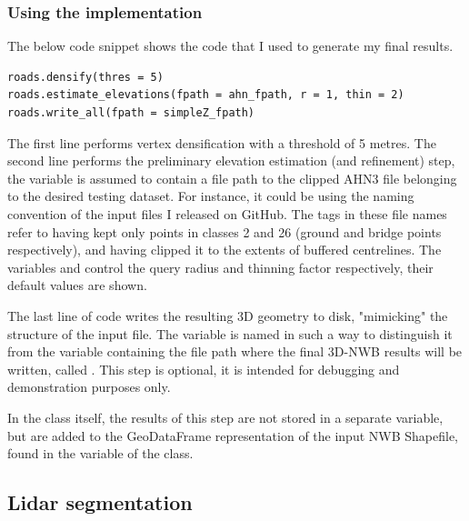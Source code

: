 \subsubsection{Using the implementation}

The below code snippet shows the code that I used to generate my final results.

\begin{lstlisting}
roads.densify(thres = 5)
roads.estimate_elevations(fpath = ahn_fpath, r = 1, thin = 2)
roads.write_all(fpath = simpleZ_fpath)
\end{lstlisting}

The first line performs vertex densification with a threshold of 5 metres. The second line performs the preliminary elevation estimation (and refinement) step, the variable  is assumed to contain a file path to the clipped AHN3 file belonging to the desired testing dataset. For instance, it could be  using the naming convention of the input files I released on GitHub. The tags  in these file names refer to having kept only points in classes 2 and 26 (ground and bridge points respectively), and having clipped it to the extents of buffered centrelines. The variables  and  control the query radius and thinning factor respectively, their default values are shown.

The last line of code writes the resulting 3D geometry to disk, "mimicking" the structure of the input file. The variable is named in such a way to distinguish it from the variable containing the file path where the final 3D-NWB results will be written, called . This step is optional, it is intended for debugging and demonstration purposes only.

In the class itself, the results of this step are not stored in a separate variable, but are added to the GeoDataFrame representation of the input NWB Shapefile, found in the  variable of the  class.

\subsection{Lidar segmentation}
\label{sub:r_lidarsegmentation}

